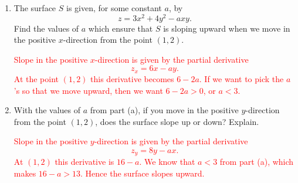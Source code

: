 \documentclass[12pt,reqno]{amsart}
\begin{document}
\begin{enumerate}
\item The surface $S$ is given, for some constant $a$, by
	\[z = 3x^2 + 4y^2 - axy.
	\]
Find the values of $a$ which ensure that $S$ is sloping upward when we move in the positive $x$-direction from the point $(1, 2)$.

\bigskip
\textcolor{red}{Slope in the positive $x$-direction is given by the partial derivative
	\[z_x = 6x - ay.
	\]
At the point $(1,2)$ this derivative becomes $6-2a$. If we want to pick the $a$'s so that we move upward, then we want $6-2a>0$, or $a<3$.}
\bigskip

\item With the values of $a$ from part (a), if you move in the positive $y$-direction from the point $(1, 2)$, does the surface slope up or down? Explain.

\bigskip
\textcolor{red}{Slope in the positive $y$-direction is given by the partial derivative
	\[z_y = 8y - ax.
	\]
At $(1,2)$ this derivative is $16-a$. We know that $a<3$ from part (a), which makes $16-a>13$. Hence the surface slopes upward.}

\end{enumerate}
\end{document}
